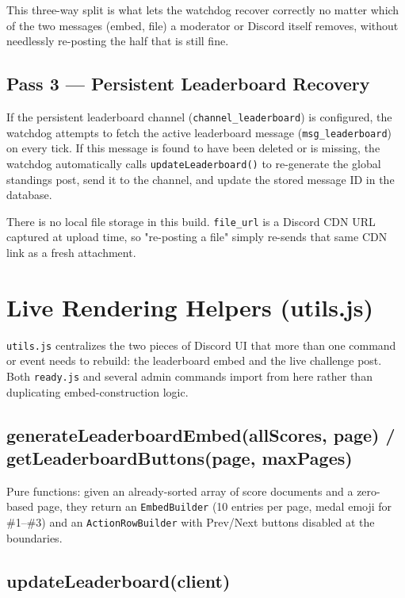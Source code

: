 \documentclass[12pt,a4paper]{report}
\newcommand{\file}[1]{\texttt{\color{cyberpurple!80!black}#1}}
\newcommand{\note}[1]{
    \begin{tcolorbox}[colback=cyberblue!5, colframe=cyberblue,
        title=\textbf{NOTE}, fonttitle=\sffamily\small]
    #1
    \end{tcolorbox}
}
\begin{document}
This three-way split is what lets the watchdog recover correctly no matter which of the two
messages (embed, file) a moderator or Discord itself removes, without needlessly re-posting the
half that is still fine.

\section{Pass 3 --- Persistent Leaderboard Recovery}

If the persistent leaderboard channel (\texttt{channel\_leaderboard}) is configured, the watchdog
attempts to fetch the active leaderboard message (\texttt{msg\_leaderboard}) on every tick.
If this message is found to have been deleted or is missing, the watchdog automatically calls
\texttt{updateLeaderboard()} to re-generate the global standings post, send it to the channel,
and update the stored message ID in the database.

\note{
There is no local file storage in this build. \texttt{file\_url} is a Discord CDN URL captured at
upload time, so "re-posting a file" simply re-sends that same CDN link as a fresh attachment.
}

\newpage
\chapter{Live Rendering Helpers (utils.js)}

\file{utils.js} centralizes the two pieces of Discord UI that more than one command or event needs
to rebuild: the leaderboard embed and the live challenge post. Both \file{ready.js} and several
admin commands import from here rather than duplicating embed-construction logic.

\section{generateLeaderboardEmbed(allScores, page) / getLeaderboardButtons(page, maxPages)}

Pure functions: given an already-sorted array of score documents and a zero-based page, they
return an \texttt{EmbedBuilder} (10 entries per page, medal emoji for \#1--\#3) and an
\texttt{ActionRowBuilder} with Prev/Next buttons disabled at the boundaries.

\section{updateLeaderboard(client)}
\end{document}
